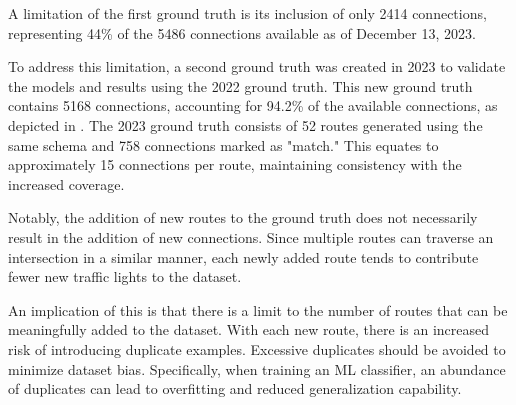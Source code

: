 A limitation of the first ground truth is its inclusion of only 2414 connections, representing 44\% of the 5486 connections available as of December 13, 2023.

To address this limitation, a second ground truth was created in 2023 to validate the models and results using the 2022 ground truth. This new ground truth contains 5168 connections, accounting for 94.2\% of the available connections, as depicted in . The 2023 ground truth consists of 52 routes generated using the same schema and 758 connections marked as "match." This equates to approximately 15 connections per route, maintaining consistency with the increased coverage.

Notably, the addition of new routes to the ground truth does not necessarily result in the addition of new connections. Since multiple routes can traverse an intersection in a similar manner, each newly added route tends to contribute fewer new traffic lights to the dataset.

An implication of this is that there is a limit to the number of routes that can be meaningfully added to the dataset. With each new route, there is an increased risk of introducing duplicate examples. Excessive duplicates should be avoided to minimize dataset bias. Specifically, when training an ML classifier, an abundance of duplicates can lead to overfitting and reduced generalization capability.

